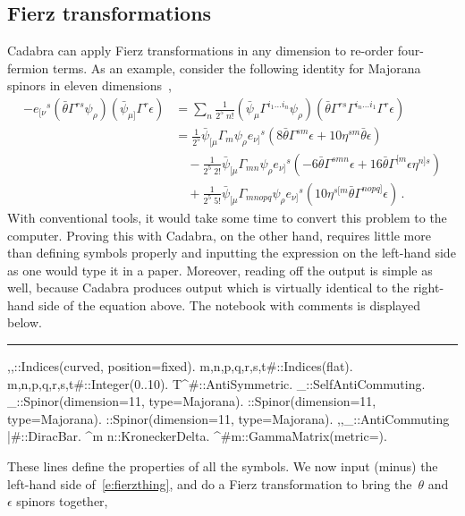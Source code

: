 \documentclass[11pt]{article}
\newenvironment{hanging}
    {\begin{list}{}{\setlength\itemsep{0pt}%
 \setlength\topsep{0pt}%
 \setlength\leftmargin{25pt}%
 \setlength\itemindent{0pt}%
 \setlength\listparindent{\itemindent}}%
     \item[]}
    {\end{list}}
\newcommand{\toprule}{\par\vspace{1ex}\noindent\hspace{25pt}\rule{435pt}{.1pt}}
\newenvironment{cdbin}{\fvset{firstnumber=1}\color[named]{Blue}\Verbatim}{\endVerbatim}
\newenvironment{cdbcom}{\begin{hanging}}{\end{hanging}}
\newcommand{\Cdb}{{Cadabra}\xspace}
\begin{document}
\subsection{Fierz transformations}
\label{s:example3}

\Cdb can apply Fierz transformations in any dimension to re-order
four-fermion terms. As an example, consider the following identity for
Majorana spinors in eleven dimensions~\cite{deWit:1998tk},
\begin{equation}
\begin{aligned}
\label{e:fierzthing}
-e_{[\nu}{}^s (\bar \theta \Gamma^{rs} \psi_\rho)(\bar\psi_{\mu]} \Gamma^r \epsilon) &=
\sum_{n} \frac{1}{2^5\; n!} (\bar\psi_\mu \Gamma^{i_1\ldots i_n} \psi_\rho)
(\bar\theta \Gamma^{rs} \Gamma^{i_n\ldots i_1} \Gamma^{r} \epsilon) \\
&= \frac{1}{2^5} \bar\psi_{[\mu} \Gamma_m \psi_\rho e_{\nu]}{}^s \left( 8 \bar\theta \Gamma^{sm}\epsilon
+ 10 \eta^{sm} \bar\theta\epsilon\right) \\
&\quad - \frac{1}{2^5\; 2!} \bar\psi_{[\mu}\Gamma_{mn} \psi_\rho e_{\nu]}{}^s\left(
-6 \bar\theta\Gamma^{smn} \epsilon + 16\bar\theta \Gamma^{[m} \epsilon \eta^{n]s}\right)\\
&\quad + \frac{1}{2^5\; 5!} \bar\psi_{[\mu}\Gamma_{mnopq} \psi_\rho e_{\nu]}{}^s \left(
10 \eta^{s[m} \bar\theta\Gamma^{nopq]} \epsilon\right) \, .
\end{aligned}
\end{equation}
With conventional tools, it would take some time to convert this
problem to the computer. Proving this with \Cdb, on the other hand,
requires little more than defining symbols properly and inputting the
expression on the left-hand side as one would type it in a
paper. Moreover, reading off the output is simple as well, because \Cdb produces
output which is virtually identical to the right-hand side of the
equation above. The notebook with comments is displayed below.\vfill\eject
\toprule
\begin{cdbin}
{\mu,\nu,\rho}::Indices(curved, position=fixed).
{m,n,p,q,r,s,t#}::Indices(flat).
{m,n,p,q,r,s,t#}::Integer(0..10).
T^{#{\mu}}::AntiSymmetric.
\psi_{\mu}::SelfAntiCommuting.
\psi_{\mu}::Spinor(dimension=11, type=Majorana).
\theta::Spinor(dimension=11, type=Majorana).
\epsilon::Spinor(dimension=11, type=Majorana).
{\theta,\epsilon,\psi_{\mu}}::AntiCommuting
\bar{#}::DiracBar.
\delta^{m n}::KroneckerDelta.
\Gamma^{#{m}}::GammaMatrix(metric=\delta).
\end{cdbin}
\begin{cdbcom}
These lines define the properties of all the symbols. We now
input (minus) the left-hand side of~\eqref{e:fierzthing}, and do a Fierz
transformation to bring the~$\theta$ and~$\epsilon$ spinors together,
\end{cdbcom}
\end{document}
